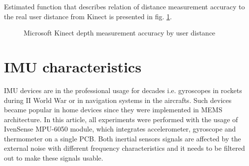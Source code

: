 \documentclass{llncs}
\begin{document}
Estimated function that describes relation of distance measurement accuracy to the real user distance from Kinect is presented in fig. \ref{fig:characteristics:kinect:distanceAccuracy}.
		
\pgfplotsset{width=8cm,compat=1.8}
		
\begin{figure}[h!]
	\centering
						
	\caption{Microsoft Kinect depth measurement accuracy by user distance}
	\label{fig:characteristics:kinect:distanceAccuracy}
\end{figure}
		
\section{IMU characteristics}
IMU devices are in the professional usage for decades i.e. gyroscopes in rockets during II World War or in navigation systems in the aircrafts. Such devices became popular in home devices since they were implemented in MEMS architecture. In this article, all experiments were performed with the usage of IvenSense MPU-6050 module, which integrates accelerometer, gyroscope and thermometer on a single PCB. Both inertial sensors signals are affected by the external noise with different frequency characteristics and it needs to be filtered out to make these signals usable.
\end{document}
